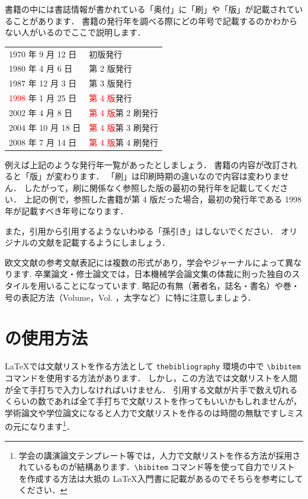 書籍の中には書誌情報が書かれている「奥付」に「刷」や「版」が記載されていることがあります．
書籍の発行年を調べる際にどの年号で記載するのかわからない人がいるのでここで説明します．
\begin{center}
    \begin{tabular}{ll}
        1970 年 9 月 12 日  & 初版発行 \\
        1980 年 4 月 6 日   & 第 2 版発行 \\
        1987 年 12 月 3 日  & 第 3 版発行 \\
        \textcolor{red}{1998} 年 1 月 25 日  & \textcolor{red}{第 4 版}発行 \\
        2002 年 4 月 8 日   & \textcolor{red}{第 4 版}第 2 刷発行 \\
        2004 年 10 月 18 日 & \textcolor{red}{第 4 版}第 3 刷発行 \\
        2008 年 7 月 14 日  & \textcolor{red}{第 4 版}第 4 刷発行
    \end{tabular}
\end{center}
例えば上記のような発行年一覧があったとしましょう．
書籍の内容が改訂されると「版」が変わります．
「刷」は印刷時期の違いなので内容は変わりません．
したがって，刷に関係なく参照した版の最初の発行年を記載してください．
上記の例で，参照した書籍が第 4 版だった場合，最初の発行年である 1998 年が記載すべき年号になります．

また，引用から引用するようないわゆる「孫引き」はしないでください．
オリジナルの文献を記載するようにしましょう．

\begin{tcolorbox}[title={余談：参考文献の書き方}]
    欧文文献の参考文献表記には複数の形式があり，学会やジャーナルによって異なります.
    卒業論文・修士論文では，日本機械学会論文集の体裁に則った独自のスタイルを用いることになっています.
    略記の有無（著者名，誌名・書名）や巻・号の表記方法（Volume，Vol. ，太字など）に特に注意しましょう．
\end{tcolorbox}


\section{\BibTeX の使用方法}
\label{sec:howtouse_bibtex}

\LaTeX では文献リストを作る方法として \verb|thebibliography| 環境の中で \verb|\bibitem| コマンドを使用する方法があります．
しかし，この方法では文献リストを人間が全て手打ちで入力しなければいけません．
引用する文献が片手で数え切れるくらいの数であれば全て手打ちで文献リストを作ってもいいかもしれませんが，学術論文や学位論文になると人力で文献リストを作るのは時間の無駄ですしミスの元になります\footnote{学会の講演論文テンプレート等では，人力で文献リストを作る方法が採用されているものが結構あります．\texttt{\textbackslash bibitem} コマンド等を使って自力でリストを作成する方法は大抵の \LaTeX 入門書に記載があるのでそちらを参考にしてください．}．

